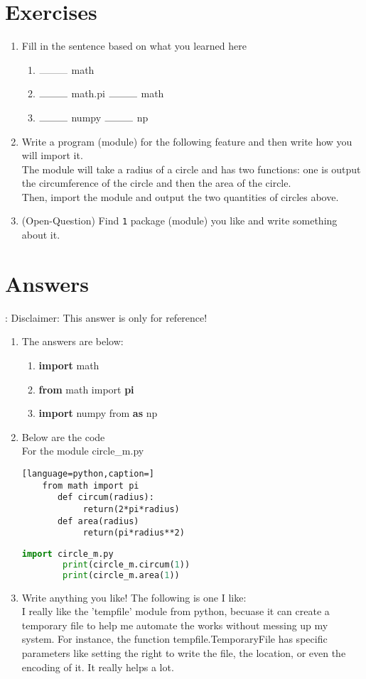\documentclass[12pt]{article}
\begin{document}
\section{Exercises}
\begin{enumerate}
	\item Fill in the sentence based on what you learned here
		\begin{enumerate}
			\item $\rule{1cm}{0.10mm}$ math
			\item $\rule{1cm}{0.10mm}$ math.pi $\rule{1cm}{0.10mm}$ math
			\item $\rule{1cm}{0.10mm}$ numpy $\rule{1cm}{0.10mm}$ np
		\end{enumerate}
	\item Write a program (module) for the following feature and then write how you will import it.
		\\ The module will take a radius of a circle and has two functions: one is output the circumference of the circle and then the area of the circle.
		\\ Then, import the module and output the two quantities of circles above.
	\item (Open-Question) Find \texttt{1} package (module) you like and write something about it.
\end{enumerate}
\newpage
\section{Answers}:
Disclaimer: This answer is only for reference!
\begin{enumerate}
	\item The answers are below:
		\begin{enumerate}
			\item \textbf{import} math	
			\item \textbf{from} math import \textbf{pi}
			\item \textbf{import} numpy from \textbf{as} np 
		\end{enumerate}
	\item Below are the code
	\\ For the module circle\_m.py
	\begin{lstlisting}[language=python,caption=]
	from math import pi
	   def circum(radius):
		    return(2*pi*radius)
	   def area(radius)
		    return(pi*radius**2)
	\end{lstlisting}
	\begin{lstlisting}[language=python,caption=Pt.2]
		import circle_m.py
		print(circle_m.circum(1))
		print(circle_m.area(1))
	\end{lstlisting}

	\item Write anything you like! The following is one I like:
		\\ I really like the 'tempfile' module from python, becuase it can create a temporary file to help me automate the works without messing up my system. For instance, the function tempfile.TemporaryFile has specific parameters like setting the right to write the file, the location, or even the encoding of it. It really helps a lot.
\end{enumerate}
\end{document}
